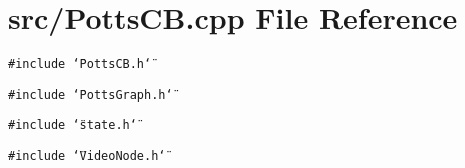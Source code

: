\section{src/PottsCB.cpp File Reference}
\label{PottsCB_8cpp}
{\tt \#include \char`\"{}PottsCB.h\char`\"{}}\par
{\tt \#include \char`\"{}PottsGraph.h\char`\"{}}\par
{\tt \#include \char`\"{}state.h\char`\"{}}\par
{\tt \#include \char`\"{}VideoNode.h\char`\"{}}\par
